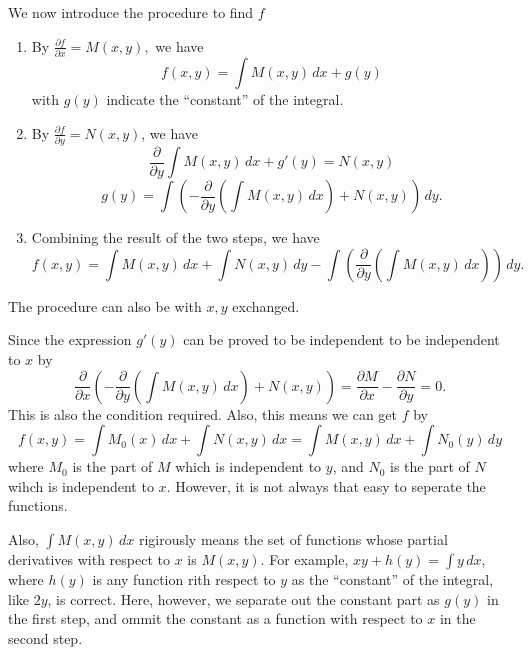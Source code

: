 \documentclass[12pt,a4paper]{report}
\theoremstyle{definition}
\theoremstyle{remark}
\begin{document}
We now introduce the procedure to find $f$

\begin{enumerate}
    \item By $\displaystyle \frac{\partial f}{\partial x} = M(x, y),$ we have 
    \[f(x, y) = \int M(x, y)\, dx + g(y)\]
    with $g(y)$ indicate the ``constant'' of the integral.
    \item By $\displaystyle \frac{\partial f}{\partial y} = N(x, y)$, we have 
    \[\frac{\partial}{\partial y} \int M(x, y)\, dx +  g'(y) = N(x, y)\]
    \[g(y) = \int \left(-\frac{\partial}{\partial y}\left(\int M(x, y) \, dx\right)  + N(x, y) \right) \, dy.\]
    \item Combining the result of the two steps, we have
    \[f(x, y) = \int M(x, y)\, dx + \int N(x, y) \, dy - \int \left(\frac{\partial}{\partial y}\left(\int M(x, y) \, dx\right)\right) \, dy.\]
\end{enumerate}


The procedure can also be with $x, y$ exchanged.

Since the expression $g'(y)$ can be proved to be independent to be independent to $x$ by
\[\frac{\partial}{\partial x} \left(-\frac{\partial}{\partial y}\left(\int M(x, y) \, dx\right)  + N(x, y) \right) = \frac{\partial M}{\partial x} - \frac{\partial N}{\partial y} = 0.\]
This is also the condition required. Also, this means we can get $f$ by 
\[f(x, y) = \int M_0(x) \, dx + \int N(x, y) \, dx = \int M(x, y) \, dx + \int N_0(y) \, dy\]
where $M_0$ is the part of $M$ which is independent to $y$, and $N_0$ is the part of $N$ wihch is independent to $x$. However, it is not always that easy to seperate the functions. 

Also, $\displaystyle{\int M(x, y) \, dx}$ rigirously means the set of functions whose partial derivatives with respect to $x$ is $M(x, y).$ For example, $xy + h(y) = \displaystyle\int y \, dx$, where $h(y)$ is any function rith respect to $y$ as the ``constant'' of the integral, like $2y$, is correct. Here, however, we separate out the constant part as $g(y)$ in the first step, and ommit the constant as a function with respect to $x$ in the second step.
\end{document}
